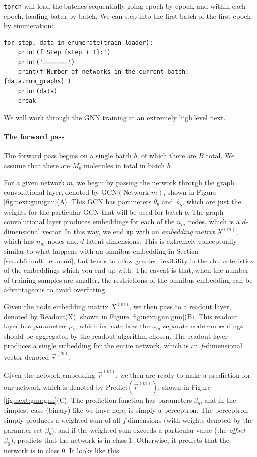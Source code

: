 \texttt{torch} will load the batches sequentially going epoch-by-epoch, and within each epoch, loading batch-by-batch. We can step into the first batch of the first epoch by enumeration:

\begin{lstlisting}[style=python]
for step, data in enumerate(train_loader):
    print(f'Step {step + 1}:')
    print('=======')
    print(f'Number of networks in the current batch: {data.num_graphs}')
    print(data)
    break
\end{lstlisting}

We will work through the GNN training at an extremely high level next. 

\paragraph*{The forward pass}

The forward pass begins on a single batch $b$, of which there are $B$ total. We assume that there are $M_b$ molecules in total in batch $b$.

For a given network $m$, we begin by passing the network through the graph convolutional layer, denoted by $\text{GCN}\left(\text{Network }m\right)$, shown in Figure \ref{fig:next:gnn:gnn}(A). This GCN has parameters $\theta_b$ and $\phi_b$, which are just the weights for the particular GCN that will be used for batch $b$. The graph convolutional layer produces embeddings for each of the $n_m$ nodes, which is a $d$-dimensional vector. In this way, we end up with an \textit{embedding matrix} $X^{(m)}$, which has $n_m$ nodes and $d$ latent dimensions. This is extremely conceptually similar to what happens with an omnibus embedding in Section \ref{sec:ch6:multinet:omni}, but tends to allow greater flexibility in the characteristics of the embeddings which you end up with. The caveat is that, when the number of training samples are smaller, the restrictions of the omnibus embedding can be advantageous to avoid overfitting.

Given the node embedding matrix $X^{(m)}$, we then pass to a readout layer, denoted by Readout(X), shown in Figure \ref{fig:next:gnn:gnn}(B). This readout layer has parameters $\rho_b$, which indicate how the $n_m$ separate node embeddings should be aggregated by the readout algorithm chosen. The readout layer produces a single embedding for the entire network, which is an $f$-dimensional vector denoted $\vec r^{(m)}$.

Given the network embedding $\vec r^{(m)}$, we then are ready to make a prediction for our network which is denoted by $\text{Predict}\left(\vec r^{(m)}\right)$, shown in Figure \ref{fig:next:gnn:gnn}(C). The prediction function has parameters $\beta_b$, and in the simplest case (binary) like we have here, is simply a perceptron. The perceptron simply produces a weighted sum of all $f$ dimensions (with weights denoted by the paramter set $\beta_b$), and if the weighted sum exceeds a particular value (the \textit{offset} $\beta_0$), predicts that the network is in class $1$. Otherwise, it predicts that the network is in class $0$. It looks like this:

